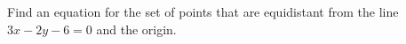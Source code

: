 Find an equation for the set of points that are equidistant from the line $3x-2y-6=0$ and the origin.
